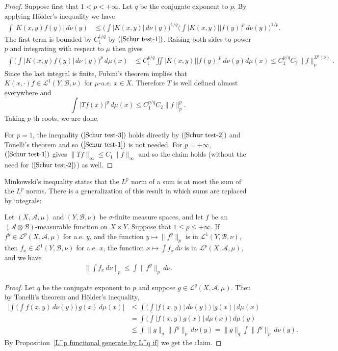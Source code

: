 \begin{proof}
Suppose first that $1<p<+\infty$. Let $q$ be the conjugate exponent to $p$. By applying H\"older's inequality we have
\begin{align*}
\int|K(x,y)f(y)|\,d\nu(y)&\leq\Big(\int|K(x,y)|\,d\nu(y)\Big)^{1/q}\Big(\int|K(x,y)||f(y)|^p\,d\nu(y)\Big)^{1/p}.
\end{align*}
The first term is bounded by $C_1^{1/q}$ by $(\ref{Schur test-1})$. Raising both sides to power $p$ and integrating with respect to $\mu$ then gives
\begin{align}\label{Schur test-3}
\int\Big(\int|K(x,y)f(y)|\,d\nu(y)\Big)^p\,d\mu(x)&\leq C_1^{p/q}\iint|K(x,y)||f(y)|^p\,d\nu(y)d\mu(x)\leq C_1^{p/q}C_2\|f\|_{p}^{L^p(\nu)}.
\end{align}
Since the last integral is finite, Fubini's theorem implies that $K(x,\cdot)f\in\mathcal{L}^1(Y,\mathcal{B},\nu)$ for $\mu$-a.e. $x\in X$. Therefore $T$ is well defined almost everywhere and 
\[\int|Tf(x)|^p\,d\mu(x)\leq C_1^{p/q}C_2\|f\|_p^p.\]
Taking $p$-th roots, we are done.\par
For $p=1$, the inequality $(\ref{Schur test-3})$ holds directly by $(\ref{Schur test-2})$ and Tonelli's theorem and so $(\ref{Schur test-1})$ is not needed. For $p=+\infty$, $(\ref{Schur test-1})$ gives $\|Tf\|_\infty\leq C_1\|f\|_\infty$ and so the claim holds (without the need for $(\ref{Schur test-2})$) as well. 
\end{proof}
Minkowski's inequality states that the $L^p$ norm of a sum is at most the sum of the $L^p$ norms. There is a generalization of this result in which sums are replaced by integrals:
\begin{theorem}
Let $(X,\mathcal{A},\mu)$ and $(Y,\mathcal{B},\nu)$ be $\sigma$-finite measure spaces, and let $f$ be an $(\mathcal{A}\otimes\mathcal{B})$-measurable function on $X\times Y$. Suppose that $1\leq p\leq+\infty$. If $f^y\in\mathcal{L}^p(X,\mathcal{A},\mu)$ for a.e. $y$, and the function $y\mapsto\|f^y\|_p$ is in $\mathcal{L}^1(Y,\mathcal{B},\nu)$, then $f_x\in\mathcal{L}^1(Y,\mathcal{B},\nu)$ for a.e. $x$, the function $x\mapsto\int f_x\,d\nu$ is in $\mathcal{L}^p(X,\mathcal{A},\mu)$, and we have
\begin{align}\label{Minkowski inequality for integral}
\Big\|\int f_x\,d\nu\Big\|_p\leq\int\|f^y\|_p\,d\nu.
\end{align}
\end{theorem}
\begin{proof}
Let $q$ be the conjugate exponent to $p$ and suppose $g\in\mathcal{L}^q(X,\mathcal{A},\mu)$. Then by Tonelli's theorem and H\"older's inequality,
\begin{align*}
\Big|\int\Big(\int f(x,y)\,d\nu(y)\Big)\,g(x)\,d\mu(x)\Big|&\leq\int\Big(\int|f(x,y)|\,d\nu(y)\Big)\,|g(x)|\,d\mu(x)\\
&=\int\Big(\int |f(x,y)g(x)|\,d\mu(x)\Big)\,d\mu(y)\\
&\leq\int\|g\|_q\|f^y\|_p\,d\nu(y)=\|g\|_q\int\|f^y\|_p\,d\nu(y).
\end{align*}
By Proposition~\ref{L^p functional generate by L^q if} we get the claim.
\end{proof}
